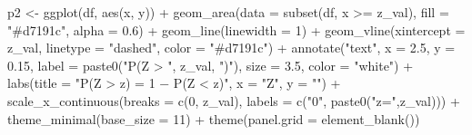\documentclass[
  12pt,
  letterpaper,
]{book}
\newenvironment{Shaded}{\begin{snugshade}}{\end{snugshade}}
\newcommand{\AttributeTok}[1]{\textcolor[rgb]{0.40,0.45,0.13}{#1}}
\newcommand{\DecValTok}[1]{\textcolor[rgb]{0.68,0.00,0.00}{#1}}
\newcommand{\FloatTok}[1]{\textcolor[rgb]{0.68,0.00,0.00}{#1}}
\newcommand{\FunctionTok}[1]{\textcolor[rgb]{0.28,0.35,0.67}{#1}}
\newcommand{\NormalTok}[1]{\textcolor[rgb]{0.00,0.23,0.31}{#1}}
\newcommand{\OtherTok}[1]{\textcolor[rgb]{0.00,0.23,0.31}{#1}}
\newcommand{\SpecialCharTok}[1]{\textcolor[rgb]{0.37,0.37,0.37}{#1}}
\newcommand{\StringTok}[1]{\textcolor[rgb]{0.13,0.47,0.30}{#1}}
\begin{document}
\begin{Shaded}
\begin{Highlighting}[]
\NormalTok{p2 }\OtherTok{\textless{}{-}} \FunctionTok{ggplot}\NormalTok{(df, }\FunctionTok{aes}\NormalTok{(x, y)) }\SpecialCharTok{+}
  \FunctionTok{geom\_area}\NormalTok{(}\AttributeTok{data =} \FunctionTok{subset}\NormalTok{(df, x }\SpecialCharTok{\textgreater{}=}\NormalTok{ z\_val), }\AttributeTok{fill =} \StringTok{"\#d7191c"}\NormalTok{, }\AttributeTok{alpha =} \FloatTok{0.6}\NormalTok{) }\SpecialCharTok{+}
  \FunctionTok{geom\_line}\NormalTok{(}\AttributeTok{linewidth =} \DecValTok{1}\NormalTok{) }\SpecialCharTok{+}
  \FunctionTok{geom\_vline}\NormalTok{(}\AttributeTok{xintercept =}\NormalTok{ z\_val, }\AttributeTok{linetype =} \StringTok{"dashed"}\NormalTok{, }\AttributeTok{color =} \StringTok{"\#d7191c"}\NormalTok{) }\SpecialCharTok{+}
  \FunctionTok{annotate}\NormalTok{(}\StringTok{"text"}\NormalTok{, }\AttributeTok{x =} \FloatTok{2.5}\NormalTok{, }\AttributeTok{y =} \FloatTok{0.15}\NormalTok{,}
           \AttributeTok{label =} \FunctionTok{paste0}\NormalTok{(}\StringTok{"P(Z \textgreater{} "}\NormalTok{, z\_val, }\StringTok{")"}\NormalTok{), }\AttributeTok{size =} \FloatTok{3.5}\NormalTok{, }\AttributeTok{color =} \StringTok{"white"}\NormalTok{) }\SpecialCharTok{+}
  \FunctionTok{labs}\NormalTok{(}\AttributeTok{title =} \StringTok{"P(Z \textgreater{} z) = 1 − P(Z \textless{} z)"}\NormalTok{, }\AttributeTok{x =} \StringTok{"Z"}\NormalTok{, }\AttributeTok{y =} \StringTok{""}\NormalTok{) }\SpecialCharTok{+}
  \FunctionTok{scale\_x\_continuous}\NormalTok{(}\AttributeTok{breaks =} \FunctionTok{c}\NormalTok{(}\DecValTok{0}\NormalTok{, z\_val),}
                     \AttributeTok{labels =} \FunctionTok{c}\NormalTok{(}\StringTok{"0"}\NormalTok{, }\FunctionTok{paste0}\NormalTok{(}\StringTok{"z="}\NormalTok{,z\_val))) }\SpecialCharTok{+}
  \FunctionTok{theme\_minimal}\NormalTok{(}\AttributeTok{base\_size =} \DecValTok{11}\NormalTok{) }\SpecialCharTok{+}
  \FunctionTok{theme}\NormalTok{(}\AttributeTok{panel.grid =} \FunctionTok{element\_blank}\NormalTok{())}


\end{Highlighting}
\end{Shaded}
\end{document}
